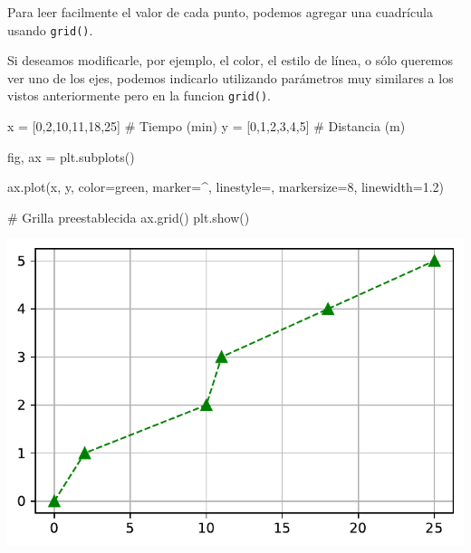 \documentclass[
  letterpaper,
  DIV=11,
  numbers=noendperiod]{scrreprt}
\newenvironment{Shaded}{\begin{snugshade}}{\end{snugshade}}
\newcommand{\CommentTok}[1]{\textcolor[rgb]{0.37,0.37,0.37}{#1}}
\newcommand{\DecValTok}[1]{\textcolor[rgb]{0.68,0.00,0.00}{#1}}
\newcommand{\FloatTok}[1]{\textcolor[rgb]{0.68,0.00,0.00}{#1}}
\newcommand{\NormalTok}[1]{\textcolor[rgb]{0.00,0.23,0.31}{#1}}
\newcommand{\OperatorTok}[1]{\textcolor[rgb]{0.37,0.37,0.37}{#1}}
\newcommand{\StringTok}[1]{\textcolor[rgb]{0.13,0.47,0.30}{#1}}
\begin{document}
Para leer facilmente el valor de cada punto, podemos agregar una
cuadrícula usando \texttt{grid()}.

Si deseamos modificarle, por ejemplo, el color, el estilo de línea, o
sólo queremos ver uno de los ejes, podemos indicarlo utilizando
parámetros muy similares a los vistos anteriormente pero en la funcion
\texttt{grid()}.

\begin{Shaded}
\begin{Highlighting}[]
\NormalTok{x }\OperatorTok{=}\NormalTok{ [}\DecValTok{0}\NormalTok{,}\DecValTok{2}\NormalTok{,}\DecValTok{10}\NormalTok{,}\DecValTok{11}\NormalTok{,}\DecValTok{18}\NormalTok{,}\DecValTok{25}\NormalTok{]   }\CommentTok{\# Tiempo (min)}
\NormalTok{y }\OperatorTok{=}\NormalTok{ [}\DecValTok{0}\NormalTok{,}\DecValTok{1}\NormalTok{,}\DecValTok{2}\NormalTok{,}\DecValTok{3}\NormalTok{,}\DecValTok{4}\NormalTok{,}\DecValTok{5}\NormalTok{]       }\CommentTok{\# Distancia (m)}

\NormalTok{fig, ax }\OperatorTok{=}\NormalTok{ plt.subplots()}

\NormalTok{ax.plot(x, y, color}\OperatorTok{=}\StringTok{\textquotesingle{}green\textquotesingle{}}\NormalTok{, marker}\OperatorTok{=}\StringTok{\textquotesingle{}\^{}\textquotesingle{}}\NormalTok{, linestyle}\OperatorTok{=}\StringTok{\textquotesingle{}{-}{-}\textquotesingle{}}\NormalTok{, markersize}\OperatorTok{=}\DecValTok{8}\NormalTok{, linewidth}\OperatorTok{=}\FloatTok{1.2}\NormalTok{)}

\CommentTok{\# Grilla preestablecida}
\NormalTok{ax.grid()}
\NormalTok{plt.show()}
\end{Highlighting}
\end{Shaded}

\includegraphics{unidad_6_files/figure-pdf/cell-112-output-1.pdf}
\end{document}
